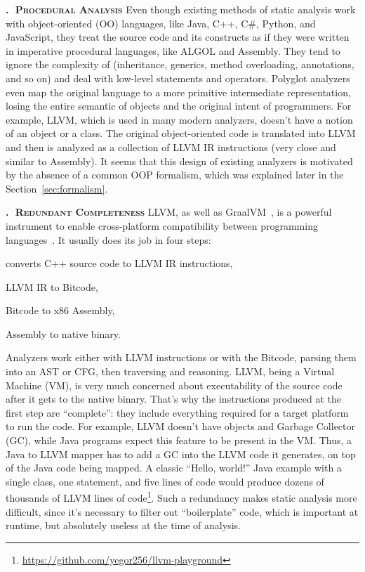 \documentclass[nosecurity,nobrand]{huawei}
\newcounter{sector}[section]
\renewcommand\thesector{\thesection.\arabic{sector}}
\newcommand{\sector}[1]{\refstepcounter{sector}\vspace{6pt}\textbf{\textsc{\thesector $\;$ #1}}\quad}
\begin{document}
\sector{Procedural Analysis}
Even though existing methods of static analysis work with object-oriented (OO)
languages, like Java, C++, C\#, Python, and JavaScript, they treat the source
code and its constructs as if they were written in imperative procedural languages, like
ALGOL and Assembly. They tend to ignore the complexity of 
(inheritance, generics, method overloading, annotations, and so on) and deal with low-level statements
and operators. Polyglot analyzers even map the original language to a more primitive
intermediate representation, losing the entire semantic of objects and the original
intent of programmers.
For example, LLVM, which is used in many modern analyzers,
doesn't have a notion of an object or a class. The original object-oriented
code is translated into LLVM and then is analyzed as a collection of LLVM IR instructions
(very close and similar to Assembly).
It seems that this design of existing analyzers is motivated by the absence
of a common OOP formalism, which was explained later in the Section~\ref{sec:formalism}.

\sector{Redundant Completeness}
LLVM, as well as GraalVM~\citep{wurthinger2013one},
is a powerful instrument to enable cross-platform
compatibility between programming languages~\citep{lattner2004llvm}.
It usually does its job in four steps:
\begin{inparaenum}[1)]
\item converts C++ source code to LLVM IR instructions,
\item LLVM IR to Bitcode,
\item Bitcode to x86 Assembly,
\item Assembly to native binary.
\end{inparaenum}
Analyzers work either with LLVM instructions or with the Bitcode,
parsing them into an AST or CFG, then traversing and reasoning.
%
LLVM, being a Virtual Machine (VM), is very much concerned about executability of the
source code after it gets to the native binary. That's why the instructions
produced at the first step are ``complete'': they include everything required
for a target platform to run the code.
For example, LLVM doesn't have objects and Garbage Collector (GC), while Java
programs expect this feature to be present in the VM. Thus, a Java to LLVM
mapper has to add a GC into the LLVM code it generates,
on top of the Java code being mapped. A classic
``Hello, world!'' Java example with a single class, one statement, and five
lines of code would produce dozens of thousands of LLVM lines of code\footnote{%
\url{https://github.com/yegor256/llvm-playground}}.
%
Such a redundancy makes static analysis more difficult, since it's
necessary to filter out ``boilerplate'' code, which is important at
runtime, but absolutely useless at the time of analysis.
\end{document}
